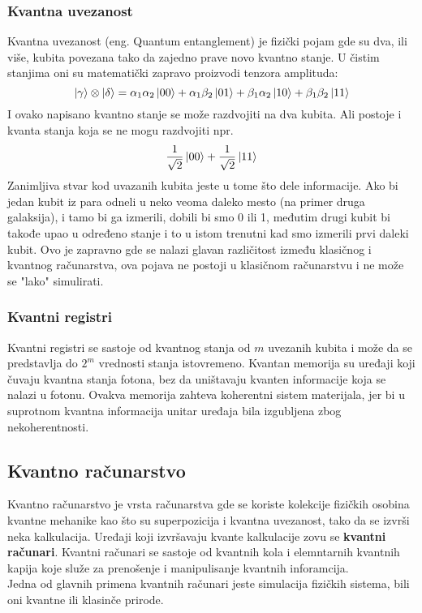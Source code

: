 \documentclass[12pt, letterpaper, oneside]{article}
\begin{document}
\subsubsection*{Kvantna uvezanost}
Kvantna uvezanost (eng. Quantum entanglement) je fizički pojam gde su dva, ili više, kubita povezana tako da zajedno prave novo kvantno stanje.
U čistim stanjima oni su matematički zapravo proizvodi tenzora amplituda:
\[
    \ket{\gamma} \otimes \ket{\delta} = \alpha_1\alpha_2\ket{00} + \alpha_1\beta_2\ket{01} + \beta_1\alpha_2\ket{10} + \beta_1\beta_2\ket{11}
\]
I ovako napisano kvantno stanje se može razdvojiti na dva kubita. Ali postoje i kvanta stanja koja se ne mogu razdvojiti npr.
\[
 \frac{1}{\sqrt{2}}\ket{00} + \frac{1}{\sqrt{2}}\ket{11}
\]
Zanimljiva stvar kod uvazanih kubita jeste u tome što dele informacije. Ako bi jedan kubit iz para odneli u neko veoma daleko mesto (na primer druga galaksija),
i tamo bi ga izmerili, dobili bi smo 0 ili 1, međutim drugi kubit bi takođe upao u određeno stanje i to u istom trenutni kad smo izmerili prvi daleki kubit. Ovo je zapravno gde se nalazi glavan različitost između klasičnog i kvantnog računarstva, ova pojava ne postoji u klasičnom računarstvu i ne može se "lako" simulirati.
\subsubsection*{Kvantni registri}
Kvantni registri se sastoje od kvantnog stanja od $m$ uvezanih kubita i može da se predstavlja do $2^m$ vrednosti stanja istovremeno.
Kvantan memorija su uređaji koji čuvaju kvantna stanja fotona, bez da uništavaju kvanten informacije koja se nalazi u fotonu.
Ovakva memorija zahteva koherentni sistem materijala, jer bi u suprotnom kvantna informacija unitar uređaja bila izgubljena zbog nekoherentnosti.

\subsection{Kvantno računarstvo}
Kvantno računarstvo je vrsta računarstva gde se koriste kolekcije fizičkih osobina kvantne mehanike kao što su superpozicija i kvantna uvezanost,
tako da se izvrši neka kalkulacija. Uređaji koji izvršavaju kvante kalkulacije zovu se \textbf{kvantni računari}.
Kvantni računari se sastoje od kvantnih kola i elemntarnih kvantnih kapija koje služe za prenošenje i manipulisanje kvantnih inforamcija.
\cite{nielsen_chuang_10th} \\
Jedna od glavnih primena kvantnih računari jeste simulacija fizičkih sistema, bili oni kvantne ili klasinče prirode.
\end{document}
